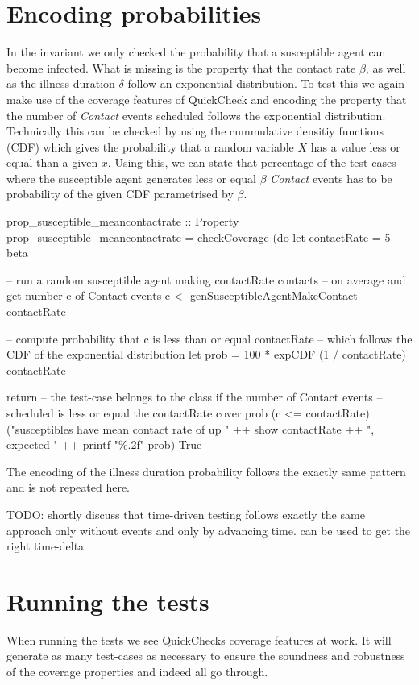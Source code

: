 \section{Encoding probabilities}
In the invariant we only checked the probability that a susceptible agent can become infected. What is missing is the property that the contact rate $\beta$, as well as the illness duration $\delta$ follow an exponential distribution. To test this we again make use of the coverage features of QuickCheck and encoding the property that the number of \textit{Contact} events scheduled follows the exponential distribution. Technically this can be checked by using the cummulative densitiy functions (CDF) which gives the probability that a random variable $X$ has a value less or equal than a given $x$. Using this, we can state that percentage of the test-cases where the susceptible agent generates less or equal $\beta$ \textit{Contact} events has to be probability of the given CDF parametrised by $\beta$.

\begin{HaskellCode}
prop_susceptible_meancontactrate :: Property
prop_susceptible_meancontactrate = checkCoverage (do
  let contactRate = 5 -- beta
  
  -- run a random susceptible agent making contactRate contacts
  -- on average and get number c of Contact events
  c <- genSusceptibleAgentMakeContact contactRate

  -- compute probability that c is less than or equal contactRate
  -- which follows the CDF of the exponential distribution
  let prob = 100 * expCDF (1 / contactRate) contactRate

  return
    -- the test-case belongs to the class if the number of Contact events
    -- scheduled is less or equal the contactRate
    cover prob (c <= contactRate) 
      ("susceptibles have mean contact rate of up " ++ show contactRate ++ 
        ", expected " ++ printf "\%.2f" prob)  True
\end{HaskellCode}

The encoding of the illness duration probability follows the exactly same pattern and is not repeated here.

TODO: shortly discuss that time-driven testing follows exactly the same approach only without events and only by advancing time. can be used to get the right time-delta

\section{Running the tests}
When running the tests we see QuickChecks coverage features at work. It will generate as many test-cases as necessary to ensure the soundness and robustness of the coverage properties and indeed all go through.

